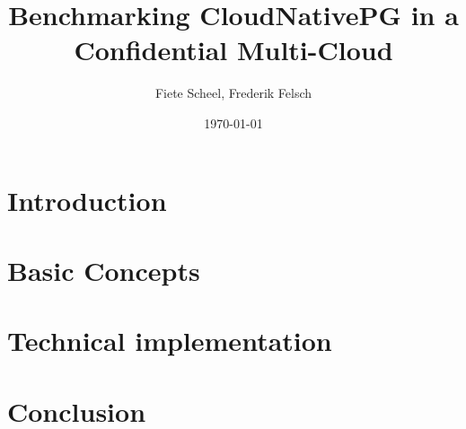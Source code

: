 \documentclass[a4paper, ngerman, 12pt]{scrreprt}
\begin{document}
\title{Benchmarking CloudNativePG in a Confidential Multi-Cloud} %
\author{Fiete Scheel, Frederik Felsch} %
\date{\today} %

\maketitle

\tableofcontents
\newpage

\chapter{Introduction}


\chapter{Basic Concepts}


\chapter{Technical implementation}


\chapter{Conclusion}


\printbibliography


\end{document}
